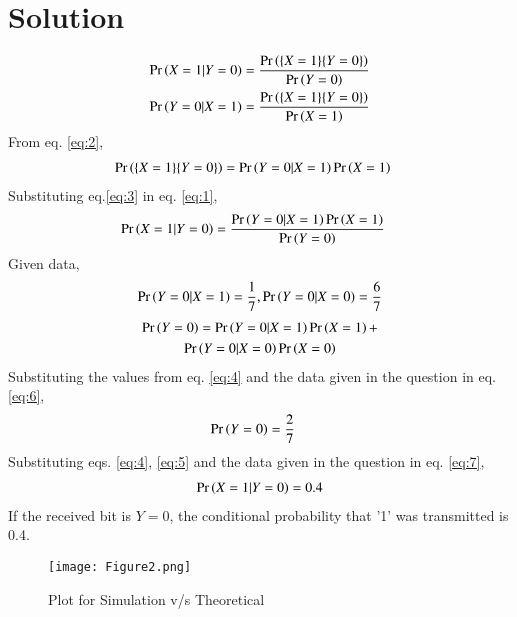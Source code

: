 \documentclass[journal,12pt,twocolumn]{IEEEtran}
\begin{document}
\section*{Solution}
\begin{align}
    \Pr\left(X = 1|Y = 0\right)&=\frac{\Pr\left(\{X=1\}\{Y=0\}\right)}{\Pr\left(Y=0\right)} \label{eq:1}\\
    \Pr\left(Y = 0|X = 1\right)&=\frac{\Pr\left(\{X=1\}\{Y=0\}\right)}{\Pr\left(X=1\right)} \label{eq:2}
\end{align}
From eq. \eqref{eq:2},
\begin{align}
    \Pr\left(\{X=1\}\{Y=0\}\right) &= \Pr\left(Y = 0|X = 1\right)\Pr\left(X=1\right) \label{eq:3}
\end{align}
Substituting eq.\eqref{eq:3} in eq. \eqref{eq:1},
\begin{align}
    \Pr\left(X = 1|Y = 0\right) &= \frac{\Pr\left(Y = 0|X = 1\right)\Pr\left(X=1\right)}{\Pr\left(Y=0\right)} \label{eq:7}
\end{align}
Given data,
\begin{align}
    \Pr\left(Y = 0|X = 1\right) =\frac{1}{7}, \Pr\left(Y =0|X=0\right)=\frac{6}{7} \label{eq:4}
\end{align}
\begin{multline}
    \Pr\left(Y=0\right) = \Pr\left(Y = 0|X = 1\right)\Pr\left(X=1\right) +\\ \Pr\left(Y = 0|X = 0\right)\Pr\left(X=0\right) \label{eq:6}
\end{multline}
Substituting the values from eq. \eqref{eq:4} and the data given in the question in eq. \eqref{eq:6},
\begin{align}
    \Pr\left(Y=0\right) &= \frac{2}{7} \label{eq:5}
\end{align}
Substituting eqs. \eqref{eq:4}, \eqref{eq:5} and the data given in the question in eq. \eqref{eq:7},
\begin{align}
    \Pr\left(X = 1|Y = 0\right) = 0.4
\end{align}
If the received bit is $Y = 0$, the conditional probability that '1' was transmitted is 0.4.
\begin{figure}[htp]
    \centering
    \texttt{[image: Figure2.png]}
    \caption{Plot for Simulation v/s Theoretical}
    \label{fig:plot}
\end{figure}
\end{document}
